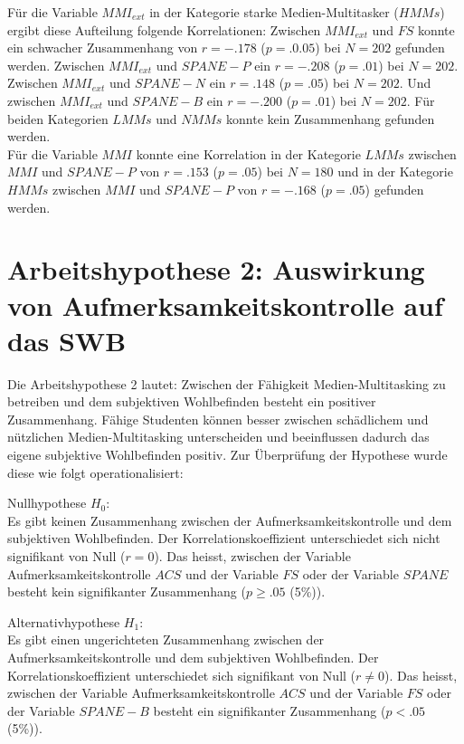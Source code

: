 Für die Variable $MMI_{ext}$ in der Kategorie starke Medien-Multitasker ($HMMs$) ergibt diese Aufteilung folgende Korrelationen: Zwischen $MMI_{ext}$ und $FS$ konnte ein schwacher Zusammenhang von $r=-.178$ ($p=.0.05$) bei $N=202$ gefunden werden. Zwischen $MMI_{ext}$ und $SPANE-P$ ein $r=-.208$ ($p=.01$) bei $N=202$. Zwischen $MMI_{ext}$ und $SPANE-N$ ein $r=.148$ ($p=.05$) bei $N=202$. Und zwischen $MMI_{ext}$ und $SPANE-B$ ein $r=-.200$ ($p=.01$) bei $N=202$. Für beiden Kategorien $LMMs$ und $NMMs$ konnte kein Zusammenhang gefunden werden.\\
Für die Variable $MMI$ konnte eine Korrelation in der Kategorie $LMMs$ zwischen $MMI$ und $SPANE-P$ von $r=.153$ ($p=.05$) bei $N=180$ und in der Kategorie $HMMs$ zwischen $MMI$ und $SPANE-P$ von $r=-.168$ ($p=.05$) gefunden werden.
\section{Arbeitshypothese 2: Auswirkung von Aufmerksamkeitskontrolle auf das SWB}\label{label.ergebnisse.arbeitshypothese2}
Die Arbeitshypothese 2 lautet: Zwischen der Fähigkeit Medien-Multitasking zu betreiben und dem subjektiven Wohlbefinden besteht ein positiver Zusammenhang. Fähige Studenten können besser zwischen schädlichem und nützlichen Medien-Multitasking unterscheiden und beeinflussen dadurch das eigene subjektive Wohlbefinden positiv. Zur Überprüfung der Hypothese wurde diese wie folgt operationalisiert:\par
Nullhypothese $H_{0}$:\\
Es gibt keinen Zusammenhang zwischen der Aufmerksamkeitskontrolle und dem subjektiven Wohlbefinden. Der Korrelationskoeffizient unterschiedet sich nicht signifikant von Null ($r=0$). Das heisst, zwischen der Variable Aufmerksamkeitskontrolle $ACS$ und der Variable $FS$ oder der Variable $SPANE$ besteht kein signifikanter Zusammenhang ($p \geq .05$ (5\%)).
\par
Alternativhypothese $H_{1}$:\\
Es gibt einen ungerichteten Zusammenhang zwischen der Aufmerksamkeitskontrolle und dem subjektiven Wohlbefinden. Der Korrelationskoeffizient unterschiedet sich signifikant von Null ($r \neq 0$). Das heisst, zwischen der Variable Aufmerksamkeitskontrolle $ACS$ und der Variable $FS$ oder der Variable $SPANE-B$ besteht ein signifikanter Zusammenhang ($p < .05$ (5\%)).
